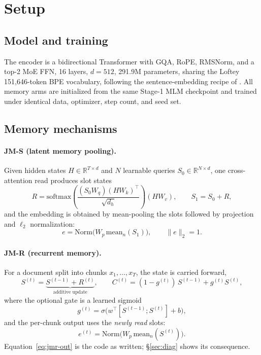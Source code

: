 \documentclass[10pt,twocolumn,letterpaper]{article}
\begin{document}
\section{Setup}

\subsection{Model and training}

The encoder is a bidirectional Transformer with GQA, RoPE, RMSNorm, and a
top-2 MoE FFN, 16 layers, $d{=}512$, 291.9M parameters, sharing the Loftey
151{,}646-token BPE vocabulary, following the sentence-embedding
recipe of \citet{reimers2019}. All memory arms are initialized from the same
Stage-1 MLM checkpoint and trained under identical data, optimizer, step count,
and seed set.

\subsection{Memory mechanisms}

\paragraph{JM-S (latent memory pooling).} Given hidden states
$H\in\mathbb{R}^{T\times d}$ and $N$ learnable queries
$S_0\in\mathbb{R}^{N\times d}$, one cross-attention read produces slot states
\begin{equation}
R = \mathrm{softmax}\!\left(\frac{(S_0 W_q)(H W_k)^\top}{\sqrt{d_h}}\right)(H W_v),
\qquad S_1 = S_0 + R ,
\label{eq:jms}
\end{equation}
and the embedding is obtained by mean-pooling the slots followed by projection
and $\ell_2$ normalization:
\begin{equation}
e = \mathrm{Norm}\big(W_p\,\mathrm{mean}_n(S_1)\big), \qquad \|e\|_2 = 1 .
\label{eq:emb}
\end{equation}

\paragraph{JM-R (recurrent memory).} For a document split into chunks
$x_1,\dots,x_T$, the state is carried forward,
\begin{equation}
S^{(t)} = \underbrace{S^{(t-1)} + R^{(t)}}_{\text{additive update}},
\qquad
C^{(t)} = (1-g^{(t)})\,S^{(t-1)} + g^{(t)} S^{(t)},
\label{eq:jmr}
\end{equation}
where the optional gate is a learned sigmoid
\begin{equation}
g^{(t)} = \sigma\!\big(w^\top [S^{(t-1)}; S^{(t)}] + b\big),
\label{eq:gate}
\end{equation}
and the per-chunk output uses the \emph{newly read} slots:
\begin{equation}
e^{(t)} = \mathrm{Norm}\big(W_p\,\mathrm{mean}_n(S^{(t)})\big).
\label{eq:jmr-out}
\end{equation}
Equation~\eqref{eq:jmr-out} is the code as written; \S\ref{sec:diag}
shows its consequence.
\end{document}
